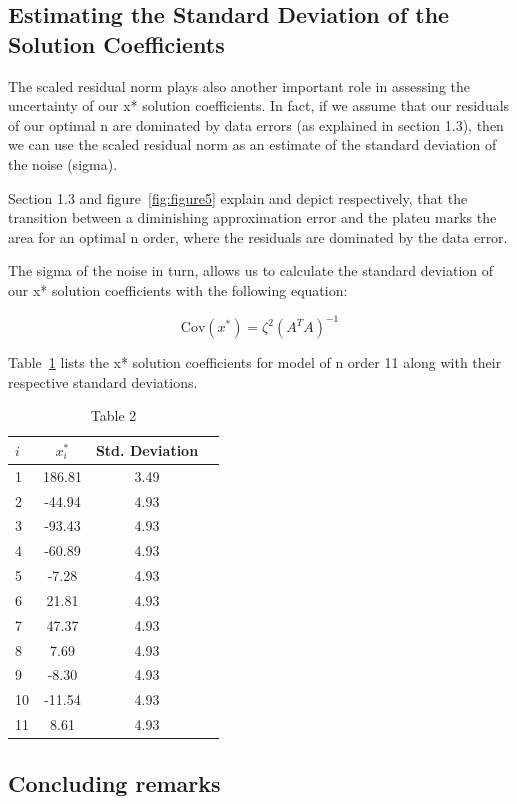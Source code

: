 \newpage
\subsection{Estimating the Standard Deviation of the Solution Coefficients}
The scaled residual norm plays also another important role in assessing the uncertainty of our x* solution coefficients. In fact, if we assume that our residuals of our optimal n are dominated by data errors (as explained in section 1.3), then we can use the scaled residual norm as an estimate of the standard deviation of the noise (sigma). 

Section 1.3 and figure~\ref{fig:figure5} explain and depict respectively, that the transition between a diminishing approximation error and the plateu marks the area for an optimal n order, where the residuals are dominated by the data error. 

The sigma of the noise in turn, allows us to calculate the standard deviation of our x* solution coefficients with the following equation:

\begin{equation}
\mathrm{Cov}(x^{*}) = \zeta^{2}(A^{T}A)^{-1}
\end{equation}

Table~\ref{tab:Table2} lists the x* solution coefficients for model of n order 11 along with their respective standard deviations. 

\begin{table}[htbp]
\centering
\begin{tabular}{l|ccc}
\hline \hline 
$i$ & $x^*_{i}$ & Std. Deviation \\ \hline
1 & 186.81	& 3.49 \\
2 & -44.94  & 4.93	 \\
3 & -93.43  & 4.93  \\
4 & -60.89  & 4.93  \\
5 &  -7.28  & 4.93  \\
6 &  21.81	& 4.93 \\
7 &  47.37	& 4.93 \\
8 &   7.69	& 4.93 \\
9 &  -8.30	& 4.93 \\
10 &-11.54  & 4.93 \\
11 &  8.61  & 4.93 \\
\hline \hline
\end{tabular}
\caption{Table 2}
\label{tab:Table2}
\end{table}

\subsection{Concluding remarks}


